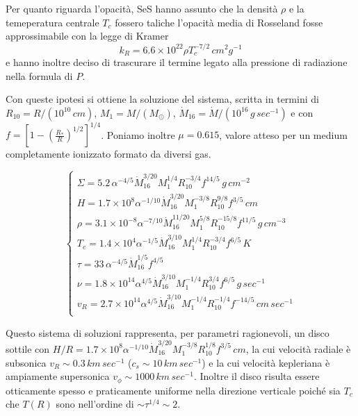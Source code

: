 \documentclass[a4paperbi]{article}
\begin{document}
Per quanto riguarda l'opacità, SeS hanno assunto che la densità $\rho$ e la temeperatura centrale $T_c$ fossero taliche l'opacità media di Rosseland fosse approssimabile con la legge di Kramer
\begin{equation}
	k_R=6.6\times10^{22}\rho T_c^{-7/2}\,cm^2g^{-1}
\end{equation}
e hanno inoltre deciso di trascurare il termine legato alla pressione di radiazione nella formula di $P$.

Con queste ipotesi si ottiene la soluzione del sistema, scritta in termini di $R_{10}=R/(10^10\,cm)$, $M_{1}=M/(M_\odot)$, $\dot{M}_{16}=\dot{M}/(10^16\,g\,sec^{-1})$ e con $f=\left[1-\left(\frac{R_*}{R}\right)^{1/2}\right]^{1/4}$. Poniamo inoltre $\mu=0.615$, valore atteso per un medium completamente ionizzato formato da diversi gas. 

\begin{equation}
	\begin{cases}
		\Sigma=5.2\,\alpha^{-4/5}\dot{M}_{16}^{3/20}M^{1/4}_1R_{10}^{-3/4}f^{14/5}\,g\,cm^{-2}\\
		H=1.7\times10^8\alpha^{-1/10}\dot{M}^{3/20}_{16}M^{-3/8}_1R_{10}^{9/8}f^{3/5}\,cm\\
		\rho=3.1\times10^{-8}\alpha^{-7/10}\dot{M}^{11/20}_{16}M^{5/8}_1R_{10}^{-15/8}f^{11/5}\,g\,cm^{-3}\\
		T_c=1.4\times10^{4}\alpha^{-1/5}\dot{M}^{3/10}_{16}M^{1/4}_1R_{10}^{-3/4}f^{6/5}\,K\\
		\tau=33\,\alpha^{-4/5}\dot{M}^{1/5}_{16}f^{4/5}\\
		\nu=1.8\times10^{14}\alpha^{4/5}\dot{M}^{3/10}_{16}M^{-1/4}_1R_{10}^{3/4}f^{6/5}\,g\,sec^{-1}\\
		v_R=2.7\times10^{14}\alpha^{4/5}\dot{M}^{3/10}_{16}M^{-1/4}_1R_{10}^{-1/4}f^{-14/5}\,cm\,sec^{-1}\\
	\end{cases}
\end{equation}

	Questo sistema di soluzioni rappresenta, per parametri ragionevoli, un disco sottile con $H/R=1.7\times10^8\alpha^{-1/10}\dot{M}^{3/20}_{16}M^{-3/8}_1R_{10}^{1/8}f^{3/5}\,cm$, la cui velocità radiale è subsonica $v_R\sim 0.3\,km\,sec^{-1}$ ($c_s\sim10\,km\,sec^{-1}$) e la cui velocità kepleriana è ampiamente supersonica $v_\phi\sim1000\,km\,sec^{-1}$. Inoltre il disco risulta essere otticamente spesso e praticamente uniforme nella direzione verticale poiché sia $T_c$ che $T(R)$ sono nell'ordine di $\sim\tau^{1/4}\sim2$.
\end{document}
